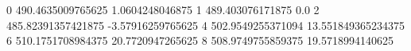 0 490.4635009765625 1.0604248046875
1 489.403076171875 0.0
2 485.82391357421875 -3.57916259765625
4 502.9549255371094 13.551849365234375
6 510.1751708984375 20.7720947265625
8 508.9749755859375 19.5718994140625
